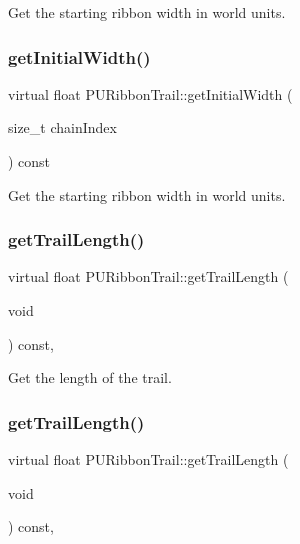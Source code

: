 Get the starting ribbon width in world units. \mbox{\label{classPURibbonTrail_a586e54109396fad4c29f0d0938a2e4df}} 
\subsubsection{\texorpdfstring{get\+Initial\+Width()}{getInitialWidth()}\hspace{0.1cm}{\footnotesize\ttfamily [2/2]}}
{\footnotesize\ttfamily virtual float P\+U\+Ribbon\+Trail\+::get\+Initial\+Width (\begin{DoxyParamCaption}\item[{size\+\_\+t}]{chain\+Index }\end{DoxyParamCaption}) const\hspace{0.3cm}{\ttfamily [virtual]}}

Get the starting ribbon width in world units. \mbox{\label{classPURibbonTrail_a1c63f6dcfb5ac3dcd9fc0abb2098e074}} 
\subsubsection{\texorpdfstring{get\+Trail\+Length()}{getTrailLength()}\hspace{0.1cm}{\footnotesize\ttfamily [1/2]}}
{\footnotesize\ttfamily virtual float P\+U\+Ribbon\+Trail\+::get\+Trail\+Length (\begin{DoxyParamCaption}\item[{void}]{ }\end{DoxyParamCaption}) const\hspace{0.3cm}{\ttfamily [inline]}, {\ttfamily [virtual]}}

Get the length of the trail. \mbox{\label{classPURibbonTrail_a1c63f6dcfb5ac3dcd9fc0abb2098e074}} 
\subsubsection{\texorpdfstring{get\+Trail\+Length()}{getTrailLength()}\hspace{0.1cm}{\footnotesize\ttfamily [2/2]}}
{\footnotesize\ttfamily virtual float P\+U\+Ribbon\+Trail\+::get\+Trail\+Length (\begin{DoxyParamCaption}\item[{void}]{ }\end{DoxyParamCaption}) const\hspace{0.3cm}{\ttfamily [inline]}, {\ttfamily [virtual]}}

